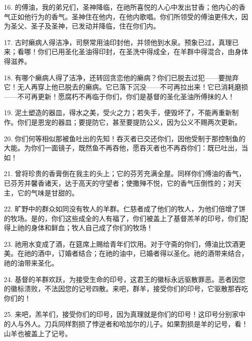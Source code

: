 16. 的傅油，我的弟兄们，圣神降临，在祂所喜悦的人心中发出甘香；他内心的香气正如他行为的香气。圣神住在他内，在他内歌唱。你们所领受的傅油更伟大，因为圣父、圣子及圣神，已发动并降临，住在你们内。\par

17. 古时癞病人得洁净，司祭常用油印封他，并领他到水泉。预象已过，真理已来；看哪！你们已用圣化圣油得印封，在圣洗中得成全，在羊群中得混合，由身体得滋养。\par

18. 有哪个癞病人得了洁净，还转回贪恋他的癞病？你们已脱去过犯——要抛弃它！无人再穿上他已脱去的癞病。它已落下沉没——不可再拉出来！它已消耗磨损——不可再更新！愿腐朽不再临于你们，你们是基督的圣化圣油所傅抹的人！\par

19. 泥土塑造的器皿，得水之美，受火之力；若失手，便毁坏了，不能再重新制作。你们是恩宠的器皿；要提防它，甚至要提防公义，因为公义不赐两次更新。\par

20. 你们何等相似那被鱼吐出的先知！吞灭者已交还你们，因他受制于那控制鱼的大能。为你们一面镜子，既然鱼不再吞他，愿吞灭者也不再吞你们：既已吐出，当如！\par

21. 曾将珍贵的香膏倒在我主的头上；它的芬芳充满全屋。同样你们傅油的香气，已芬芳并馨香诸天，达于高天的守望者；使撒殚不悦，它的香气压倒性的；对天主，它的气味是甘甜的。\par

22. 旷野中的群众如同没有牧人的羊群。仁慈者成了他们的牧人，为他们倍增了饼的牧场。是的，你们这些成全的人有福了，你们被盖上了基督羔羊的印号，你们配得上祂的身体和鲜血；牧人自己成了你们的牧场！\par

23. 祂用水变成了酒，在筵席上赐给青年们饮用。对于守斋的你们，傅油比饮酒更美。在祂的酒中，订婚者结合；在祂的油中，已婚者得以圣化。祂的酒带来结合，祂的油带来圣化。\par

24. 基督的羊群欢跃，为接受生命的印号，这君王的徽标永远驱散罪恶。恶者因您的徽标溃败，不法因您的记号四散。来吧，群羊，接受你们的印号，它驱散那吞吃你们的！\par

25. 来吧，羔羊们，接受你们的印号，因为真理就是你们的印号！这印号分别家中的人与外人。刀兵同样割损了悖逆者和哈加尔的儿子。如果割损是羊的记号，看！山羊也被盖上了记号。\par

